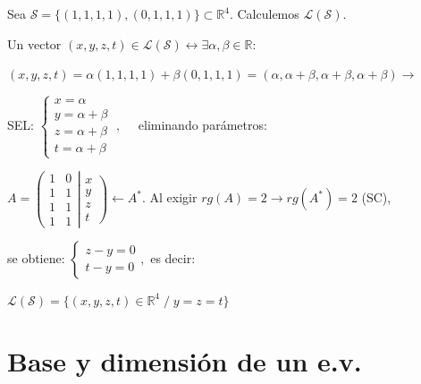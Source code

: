 \vspace{3mm}
\begin{cuadro-gris}
Sea $\mathcal S=\{(1,1,1,1),(0,1,1,1)\} \subset \mathbb R^4$. Calculemos $\mathcal {L(S)}.$	

\noindent Un vector $(x,y,z,t) \in \mathcal {L(S)} \leftrightarrow \exists \alpha, \beta \in \mathbb R : \; $

\noindent $(x,y,z,t)= \alpha (1,1,1,1) + \beta (0,1,1,1)= (\alpha, \alpha+\beta, \alpha+\beta, \alpha+\beta) \to $

\noindent SEL: $\begin{cases} x=\alpha \\ y= \alpha+\beta \\ z= \alpha+\beta \\ t= \alpha+\beta \end{cases}\; , \quad $ eliminando parámetros:

\noindent $ A=\left (\begin{matrix} \boxed{1}&\boxed{0}\\\boxed{1}&\boxed{1}\\1&1\\1&1 \end{matrix} \right| 
\left. \begin{matrix} x\\y\\z\\t  \end{matrix} \right) \leftarrow A^*$. Al exigir $rg(A)=2 \to rg(A^*)=2$ (SC),

\noindent se obtiene: $\begin{cases} z-y=0\\t-y=0  \end{cases}, $ es decir:

\noindent $\mathcal {L(S)}= \{ (x,y,z,t)\in \mathbb R^4 \; / \; y=z=t \}$
	

\end{cuadro-gris}

\setlength{\parindent}{0cm}
\section{Base y dimensión de un e.v.}
\vspace{0.5cm}

